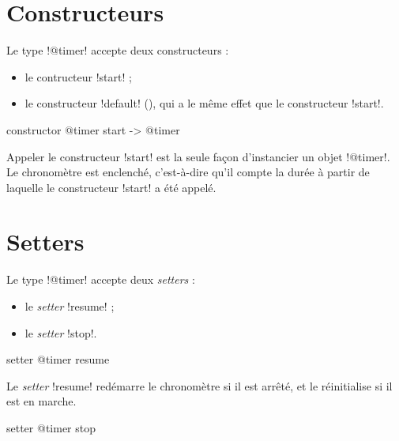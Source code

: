 


\section{Constructeurs}

Le type \ggs!@timer! accepte deux constructeurs :
\begin{itemize}
  \item le contructeur \ggs!start! ;
  \item le constructeur \ggs!default! (), qui a le même effet que le constructeur \ggs!start!.
\end{itemize}



\begin{galgasbox}
constructor @timer start -> @timer
\end{galgasbox}

Appeler le constructeur \ggs!start! est la seule façon d'instancier un objet \ggs!@timer!. Le chronomètre est enclenché, c'est-à-dire qu'il compte la durée à partir de laquelle le constructeur \ggs!start! a été appelé.







\section{Setters}

Le type \ggs!@timer! accepte deux \emph{setters} :
\begin{itemize}
  \item le \emph{setter} \ggs!resume! ;
  \item le \emph{setter} \ggs!stop!.
\end{itemize}


\begin{galgasbox}
setter @timer resume
\end{galgasbox}

Le \emph{setter} \ggs!resume! redémarre le chronomètre si il est arrêté, et le réinitialise si il est en marche.

\begin{galgasbox}
setter @timer stop
\end{galgasbox}

